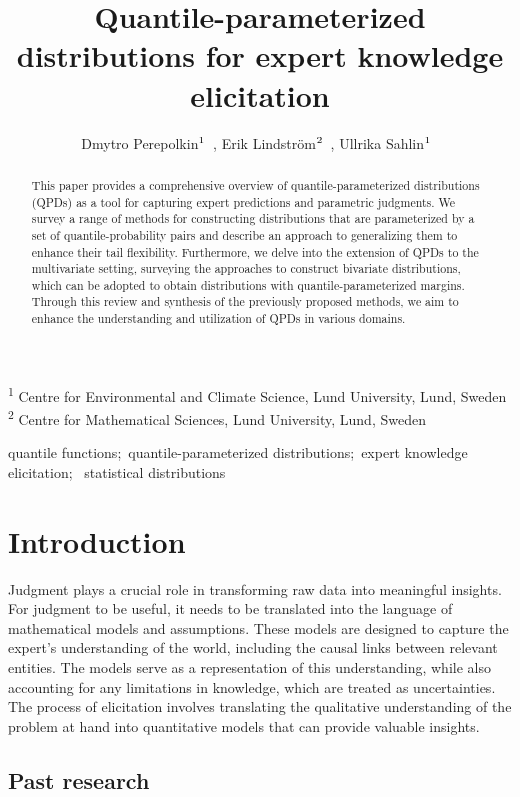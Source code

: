 \documentclass[
]{interact}
\title{Quantile-parameterized distributions for expert knowledge
elicitation}
\author{Dmytro
Perepolkin$\textsuperscript{1}$~\orcidlink{0000-0003-2402-304X}, Erik
Lindström$\textsuperscript{2}$~\orcidlink{0000-0002-6468-2624}, Ullrika
Sahlin$\textsuperscript{1}$~\orcidlink{0000-0002-2932-6253}}
\begin{document}
\captionsetup{labelsep=space}
\maketitle
\textsuperscript{1} Centre for Environmental and Climate Science, Lund
University, Lund, Sweden\\ \textsuperscript{2} Centre for Mathematical
Sciences, Lund University, Lund, Sweden
\begin{abstract}
This paper provides a comprehensive overview of quantile-parameterized
distributions (QPDs) as a tool for capturing expert predictions and
parametric judgments. We survey a range of methods for constructing
distributions that are parameterized by a set of quantile-probability
pairs and describe an approach to generalizing them to enhance their
tail flexibility. Furthermore, we delve into the extension of QPDs to
the multivariate setting, surveying the approaches to construct
bivariate distributions, which can be adopted to obtain distributions
with quantile-parameterized margins. Through this review and synthesis
of the previously proposed methods, we aim to enhance the understanding
and utilization of QPDs in various domains.
\end{abstract}
\begin{keywords}
\def\sep{;\ }
quantile functions\sep quantile-parameterized distributions\sep expert
knowledge elicitation\sep 
statistical distributions
\end{keywords}

\section{Introduction}\label{introduction}

Judgment plays a crucial role in transforming raw data into meaningful
insights. For judgment to be useful, it needs to be translated into the
language of mathematical models and assumptions. These models are
designed to capture the expert's understanding of the world, including
the causal links between relevant entities. The models serve as a
representation of this understanding, while also accounting for any
limitations in knowledge, which are treated as uncertainties. The
process of elicitation involves translating the qualitative
understanding of the problem at hand into quantitative models that can
provide valuable insights.

\subsection*{Past research}\label{past-research}
\end{document}
